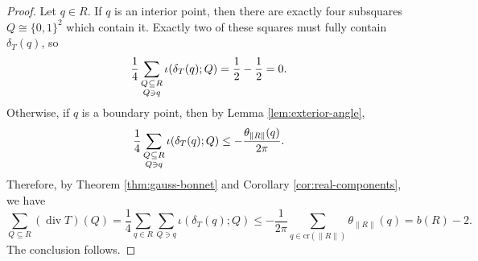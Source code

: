 \begin{proof}
  Let $q \in R$. If $q$ is an interior point, then there are exactly four subsquares $Q \cong \{0,1\}^2$ which contain it.
  Exactly two of these squares must fully contain $\delta_T(q)$, so
  \begin{equation}
    \frac{1}{4}\sum_{\substack{Q \mskip 1mu \subseteq \mskip 0.3mu R \\[0.2ex] Q \ni q}} \iota(\delta_T(q); Q) = \frac{1}{2} - \frac{1}{2} = 0.
  \end{equation}
  Otherwise, if $q$ is a boundary point, then by Lemma \ref{lem:exterior-angle},
  \begin{equation}
    \frac{1}{4}\sum_{\substack{Q \mskip 1mu \subseteq \mskip 0.3mu R \\[0.2ex] Q \ni q}} \iota(\delta_T(q); Q) \leq -\frac{\theta_{\lVert R \rVert}(q)}{2\pi}.
  \end{equation}
  Therefore, by Theorem \ref{thm:gauss-bonnet} and Corollary \ref{cor:real-components}, we have
  \begin{equation}
    \sum_{Q \subseteq R} (\operatorname{div} T)(Q) = \frac{1}{4}\sum_{q \in R} \sum_{Q \ni q} \iota(\delta_T(q); Q) \leq -\frac{1}{2\pi} \sum_{q \in \mathrm{cr}(\lVert R \rVert)} \theta_{\lVert R \rVert}(q) = b(R) - 2.
  \end{equation}
  The conclusion follows.
\end{proof}